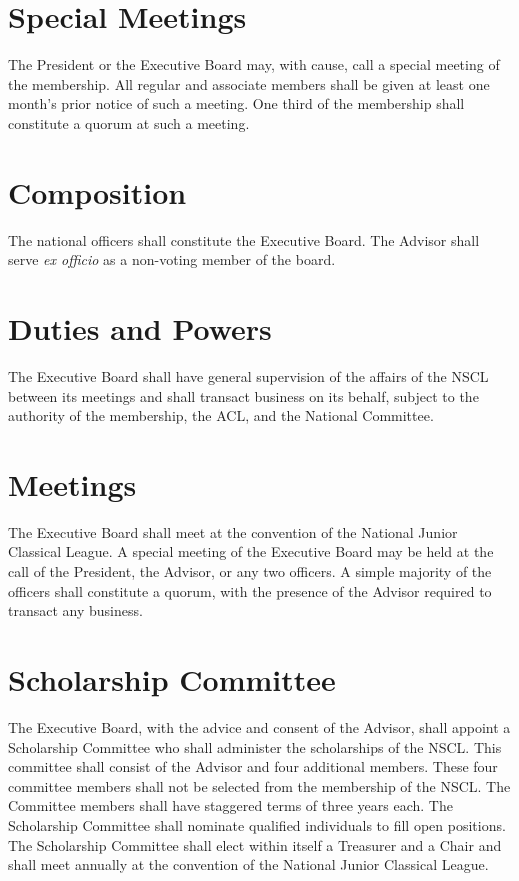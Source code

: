 \documentclass{bylaws_nofont}
\newcommand{\NSCL}{\textsc{NSCL}\xspace}
\newcommand{\ACL}{\textsc{ACL}\xspace}
\begin{document}
\begin{linenumbers}[1]
  \section{Special Meetings}
  The President or the Executive Board may, with cause, call a special
  meeting of the membership. All regular and associate members shall be
  given at least one month's prior notice of such a meeting. One third
  of the membership shall constitute a quorum at such a meeting.\\ 


  \section{Composition}
  The national officers shall constitute the Executive Board. The
  Advisor shall serve \textit{ex officio} as a non-voting member of the
  board.\\

  \section{Duties and Powers} The Executive Board shall have general
  supervision of the affairs of the \NSCL between its meetings and shall
  transact business on its behalf, subject to the authority of the
  membership, the \ACL, and the National Committee.\\

  \section{Meetings} The Executive Board shall meet at the convention
  of the National Junior Classical League. A special meeting of the
  Executive Board may be held at the call of the President, the Advisor,
  or any two officers. A simple majority of the officers shall
  constitute a quorum, with the presence of the Advisor required to
  transact any business.\\


  \section{Scholarship Committee} 
  The Executive Board, with the advice and consent of the Advisor, shall
  appoint a Scholarship Committee who shall administer the scholarships
  of the \NSCL. This committee shall consist of the Advisor and four
  additional members. These four committee members shall not be selected
  from the membership of the \NSCL. The Committee members shall have
  staggered terms of three years each. The Scholarship Committee shall
  nominate qualified individuals to fill open positions. The Scholarship
  Committee shall elect within itself a Treasurer and a Chair and shall
  meet annually at the convention of the National Junior Classical
  League.\\


\end{linenumbers}
\end{document}
